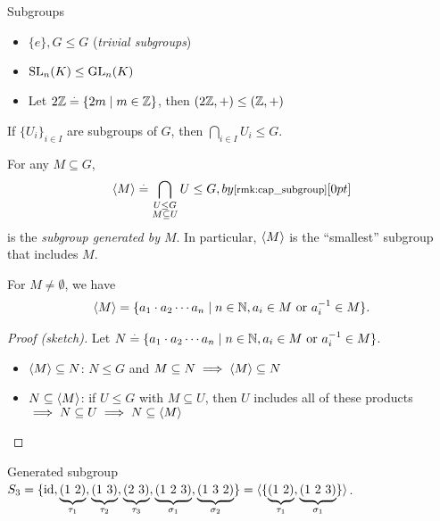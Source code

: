 \begin{ex}{Subgroups}{}
\begin{itemize}
    \item $\{e\}, G \leq G$ (\emph{trivial subgroups})
    \item $\mathrm{SL}_{n}(K) \leq \mathrm{GL}_{n}(K)$
    \item Let $2\mathbb{Z} \overset{.}{=} \{2m \mid m \in \mathbb{Z}\}$, then $(2\mathbb{Z},+) \leq (\mathbb{Z},+)$
\end{itemize}
\end{ex}

\begin{rmk}\label{rmk:cap_subgroup}
If $\{U_i\}_{i \in I}$ are subgroups of $G$, then $\bigcap_{i \in I} U_i \leq G$.
\end{rmk}

\begin{defn}
For any $M \subseteq G$, \begin{align}
    \gen{M} \defeq \bigcap_{\substack{U \leq G \\ M \subseteq U}} U \leq G, \margintag{by \cref{rmk:cap_subgroup}}
\end{align} is the \emph{subgroup generated by $M$}. In particular, $\langle M \rangle$ is the ``smallest'' subgroup that includes $M$.
\end{defn}

\begin{lem}
For $M \neq \emptyset$, we have \begin{align}
    \langle M \rangle = \{a_1 \cdot a_2 \cdots a_n \mid n \in \mathbb{N}, \text{$a_i \in M$ or $a_i^{-1} \in M$}\}.
\end{align}
\end{lem} \begin{proof}[Proof (sketch)]\leavevmode
Let $N \overset{.}{=} \{a_1 \cdot a_2 \cdots a_n \mid n \in \mathbb{N}, \text{$a_i \in M$ or $a_i^{-1} \in M$}\}$.
\begin{itemize}
    \item \underline{$\langle M \rangle \subseteq N$}: $N \leq G$ and $M \subseteq N \implies \langle M \rangle \subseteq N$ 
    \item \underline{$N \subseteq \langle M \rangle$}: if $U \leq G$ with $M \subseteq U$, then $U$ includes all of these products $\implies N \subseteq U \implies N \subseteq \langle M \rangle$ \qedhere
\end{itemize}
\end{proof}

\begin{ex}{Generated subgroup}{}
$S_3 = \{\id, \underbrace{(1\ 2)}_{\tau_1}, \underbrace{(1\ 3)}_{\tau_2}, \underbrace{(2\ 3)}_{\tau_3}, \underbrace{(1\ 2\ 3)}_{\sigma_1}, \underbrace{(1\ 3\ 2)}_{\sigma_2}\} = \gen{\{\underbrace{(1\ 2)}_{\tau_1}, \underbrace{(1\ 2\ 3)}_{\sigma_1}\}}$.
\end{ex}

